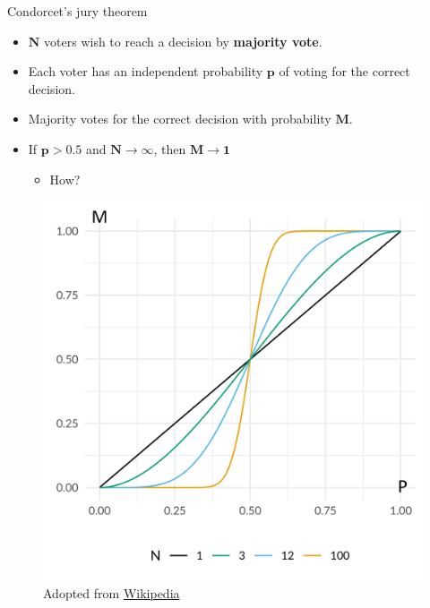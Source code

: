 \documentclass[serif, aspectratio=169]{beamer}
\begin{document}
\begin{frame}{Condorcet's jury theorem}
    \begin{itemize}
        \itemsep1em
        \justifying
        \item $\boldsymbol{N}$ voters wish to reach a decision by \textbf{majority vote}.
        \item Each voter has an independent probability $\boldsymbol{p}$ of voting for the correct decision.
        \item Majority votes for the correct decision with probability $\boldsymbol{M}$.
        \item \textcolor{deepred}{If $\boldsymbol{p > 0.5}$ and $\boldsymbol{N \to \infty}$, then $\boldsymbol{M \to 1}$}
        \begin{itemize}
            \item How?
        \end{itemize}
    \end{itemize}
    \endminipage
    \hfill
    \begin{figure}[!htb]
        \includegraphics[width=\linewidth]{pic/condorcets.png}
        {\scriptsize Adopted from \href{https://en.wikipedia.org/wiki/Condorcet\%27s_jury_theorem}{Wikipedia}}
    \end{figure}
    \endminipage
\end{frame}
\end{document}
